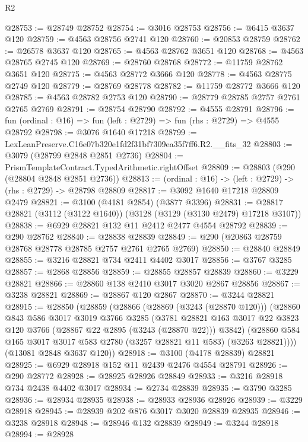 \begin{lexlean}{R2}
\begin{coremodule}
@28753 := @28749 @28752
@28754 := @3016 @28753
@28756 := @6415 @3637 @120
@28759 := @4563 @28756 @2741 @120
@28760 := @20853 @28759
@28762 := @26578 @3637 @120
@28765 := @4563 @28762 @3651 @120
@28768 := @4563 @28765 @2745 @120
@28769 := @28760 @28768
@28772 := @11759 @28762 @3651 @120
@28775 := @4563 @28772 @3666 @120
@28778 := @4563 @28775 @2749 @120
@28779 := @28769 @28778
@28782 := @11759 @28772 @3666 @120
@28785 := @4563 @28782 @2753 @120
@28790 := @28779 @28785 @2757 @2761 @2765 @2769
@28791 := @28754 @28790
@28792 := @4555 @28791
@28796 := fun (ordinal : @16) => fun (left : @2729) => fun (rhs : @2729) => @4555 @28792
@28798 := @3076 @1640 @17218
@28799 := LexLeanPreserve.C16e07b320e1fd2f31bf7309ea35f7ff6.R2.__fits_32
@28803 := @3079 (@28799 @2848 @2851 @2736)
@28804 := PrismTemplateContract.TypedArithmetic.rightOffset
@28809 := @28803 (@290 (@28804 @2848 @2851 @2736))
@28813 := (ordinal : @16) -> (left : @2729) -> (rhs : @2729) -> @28798 @28809
@28817 := @3092 @1640 @17218 @28809 @2479
@28821 := @3100 (@4181 @2854) (@3877 @3396)
@28831 := @28817 @28821 (@3112 (@3122 @1640)) (@3128 (@3129 (@3130 @2479) @17218 @3107))
@28838 := @6929 @28821 @132 @11 @2412 @2477 @4554 @28792
@28839 := @290 @28762
@28840 := @28838 @28839
@28849 := @290 (@20863 @28759 @28768 @28778 @28785 @2757 @2761 @2765 @2769)
@28850 := @28840 @28849
@28855 := @3216 @28821 @734 @2411 @4402 @3017
@28856 := @3767 @3285
@28857 := @2868 @28856
@28859 := @28855 @28857 @28839
@28860 := @3229 @28821
@28866 := @28860 @138 @2410 @3017 @3020 @2867 @28856
@28867 := @3238 @28821
@28869 := @28867 @120 @2867
@28870 := @3244 @28821
@28915 := @28850
    (@28859
      (@28866
        (@28869 (@3243 (@28870 @120)))
        (@28860
          @843
          @586
          @3017
          @3019
          @3766
          @3285
          (@3781
            @28821
            @163
            @3017
            @22
            @3823
            @120
            @3766
            (@28867 @22 @2895 (@3243 (@28870 @22)))
            @3842)
          (@28860 @584 @165 @3017 @3017 @583 @2780 (@3257 @28821 @11 @583) (@3263 @28821))))
      (@13081 @2848 @3637 @120))
@28918 := @3100 (@4178 @28839) @28821
@28925 := @6929 @28918 @152 @11 @2439 @2476 @4554 @28791
@28926 := @290 @28772
@28928 := @28925 @28926 @28849
@28933 := @3216 @28918 @734 @2438 @4402 @3017
@28934 := @2734 @28839
@28935 := @3790 @3285
@28936 := @28934 @28935
@28938 := @28933 @28936 @28926
@28939 := @3229 @28918
@28945 := @28939 @202 @876 @3017 @3020 @28839 @28935
@28946 := @3238 @28918
@28948 := @28946 @132 @28839
@28949 := @3244 @28918
@28994 := @28928

\end{coremodule}
\end{lexlean}
